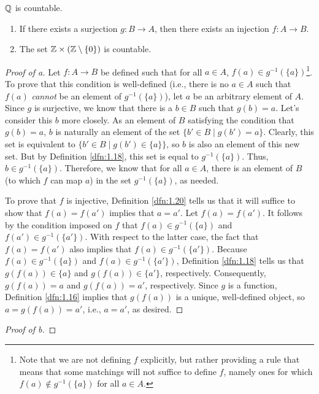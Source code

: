 \documentclass[../main.tex]{subfiles}
\begin{document}
\begin{theorem}\label{trm:2.11}
    $\mathbb{Q}$ is countable.
    \begin{lemma*}\leavevmode
        \begin{enumerate}[label={\alph*\textup{)}}]
            \item If there exists a surjection $g:B\to A$, then there exists an injection $f:A\to B$.
            \item The set $\mathbb{Z}\times(\mathbb{Z}\setminus\{0\})$ is countable.
        \end{enumerate}
        \begin{proof}[Proof of a]
            Let $f:A\to B$ be defined such that for all $a\in A$, $f(a)\in g^{-1}(\{a\})$\footnote{Note that we are not defining $f$ explicitly, but rather providing a rule that means that some matchings will not suffice to define $f$, namely ones for which $f(a)\notin g^{-1}(\{a\})$ for all $a\in A$.}. To prove that this condition is well-defined (i.e., there is no $a\in A$ such that $f(a)$ \emph{cannot} be an element of $g^{-1}(\{a\})$), let $a$ be an arbitrary element of $A$. Since $g$ is surjective, we know that there is a $b\in B$ such that $g(b)=a$. Let's consider this $b$ more closely. As an element of $B$ satisfying the condition that $g(b)=a$, $b$ is naturally an element of the set $\{b'\in B\mid g(b')=a\}$. Clearly, this set is equivalent to $\{b'\in B\mid g(b')\in\{a\}\}$, so $b$ is also an element of this new set. But by Definition \ref{dfn:1.18}, this set is equal to $g^{-1}(\{a\})$. Thus, $b\in g^{-1}(\{a\})$. Therefore, we know that for all $a\in A$, there is an element of $B$ (to which $f$ can map $a$) in the set $g^{-1}(\{a\})$, as needed.\par
            To prove that $f$ is injective, Definition \ref{dfn:1.20} tells us that it will suffice to show that $f(a)=f(a')$ implies that $a=a'$. Let $f(a)=f(a')$. It follows by the condition imposed on $f$ that $f(a)\in g^{-1}(\{a\})$ and $f(a')\in g^{-1}(\{a'\})$. With respect to the latter case, the fact that $f(a)=f(a')$ also implies that $f(a)\in g^{-1}(\{a'\})$. Because $f(a)\in g^{-1}(\{a\})$ and $f(a)\in g^{-1}(\{a'\})$, Definition \ref{dfn:1.18} tells us that $g(f(a))\in\{a\}$ and $g(f(a))\in\{a'\}$, respectively. Consequently, $g(f(a))=a$ and $g(f(a))=a'$, respectively. Since $g$ is a function, Definition \ref{dfn:1.16} implies that $g(f(a))$ is a unique, well-defined object, so $a=g(f(a))=a'$, i.e., $a=a'$, as desired.
        \end{proof}
        \begin{proof}[Proof of b]

\end{proof}
\end{lemma*}
\end{theorem}
\end{document}
